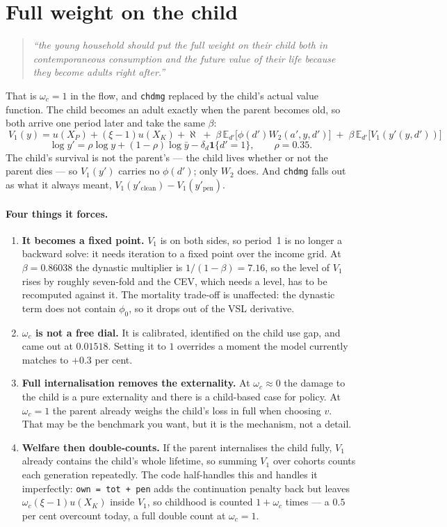 \documentclass[11pt]{article}
\begin{document}
\section{Full weight on the child}

\begin{quote}
\emph{``the young household should put the full weight on their child both in
contemporaneous consumption and the future value of their life because they
become adults right after.''}
\end{quote}

\noindent That is $\omega_c=1$ in the flow, and \texttt{chdmg} replaced by the
child's actual value function. The child becomes an adult exactly when the
parent becomes old, so both arrive one period later and take the same $\beta$:
\[
  \boxed{\;
  V_1(y)=u(X_P)+(\xi-1)u(X_K)+\aleph
  \;+\;\beta\,\mathbb{E}_{d'}\big[\phi(d')W_2(a',y,d')\big]
  \;+\;\beta\,\mathbb{E}_{d'}\big[V_1(y'(y,d'))\big]\;}
\]
\[
  \log y' = \rho\log y + (1-\rho)\log\bar y - \delta_d\mathbf{1}\{d'=1\},
  \qquad \rho=0.35 .
\]
The child's survival is not the parent's --- the child lives whether or not the
parent dies --- so $V_1(y')$ carries no $\phi(d')$; only $W_2$ does. And
\texttt{chdmg} falls out as what it always meant,
$V_1(y'_{\text{clean}})-V_1(y'_{\text{pen}})$.

\paragraph{Four things it forces.}
\begin{enumerate}\itemsep3pt
\item \textbf{It becomes a fixed point.} $V_1$ is on both sides, so period~1 is
no longer a backward solve: it needs iteration to a fixed point over the income
grid. At $\beta=0.86038$ the dynastic multiplier is $1/(1-\beta)=7.16$, so the
level of $V_1$ rises by roughly seven-fold and the CEV, which needs a level, has
to be recomputed against it. The mortality trade-off is unaffected: the dynastic
term does not contain $\phi_0$, so it drops out of the VSL derivative.
\item \textbf{$\omega_c$ is not a free dial.} It is calibrated, identified on
the child use gap, and came out at $0.01518$. Setting it to $1$ overrides a
moment the model currently matches to $+0.3$ per cent.
\item \textbf{Full internalisation removes the externality.} At
$\omega_c\approx0$ the damage to the child is a pure externality and there is a
child-based case for policy. At $\omega_c=1$ the parent already weighs the
child's loss in full when choosing $v$. That may be the benchmark you want, but
it is the mechanism, not a detail.
\item \textbf{Welfare then double-counts.} If the parent internalises the child
fully, $V_1$ already contains the child's whole lifetime, so summing $V_1$ over
cohorts counts each generation repeatedly. The code half-handles this and
handles it imperfectly: \texttt{own = tot + pen} adds the continuation penalty
back but leaves $\omega_c(\xi-1)u(X_K)$ inside $V_1$, so childhood is counted
$1+\omega_c$ times --- a $0.5$ per cent overcount today, a full double count at
$\omega_c=1$.
\end{enumerate}
\end{document}
